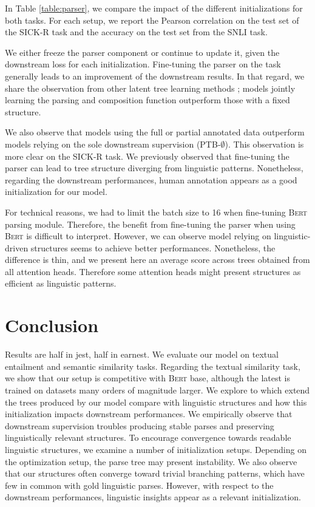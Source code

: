 In Table \ref{table:parser}, we compare the impact of the different initializations for both tasks. For each setup, we report the Pearson correlation on the test set of the SICK-R task and the accuracy on the test set from the SNLI task.

We either freeze the parser component or continue to update it, given the downstream loss for each initialization. Fine-tuning the parser on the task generally leads to an improvement of the downstream results. In that regard, we share the observation from other latent tree learning methods \parencite{maillard_19, choi_18}; models jointly learning the parsing and composition function outperform those with a fixed structure. 

We also observe that models using the full or partial annotated data outperform models relying on the sole downstream supervision (PTB-$\emptyset$). This observation is more clear on the SICK-R task. We previously observed that fine-tuning the parser can lead to tree structure diverging from linguistic patterns. Nonetheless, regarding the downstream performances, human annotation appears as a good initialization for our model. 

For technical reasons, we had to limit the batch size to 16 when fine-tuning \textsc{Bert} parsing module. Therefore, the benefit from fine-tuning the parser when using \textsc{Bert} is difficult to interpret. However, we can observe model relying on linguistic-driven structures seems to achieve better performances. Nonetheless, the difference is thin, and we present here an average score across trees obtained from all attention heads. Therefore some attention heads might present structures as efficient as linguistic patterns.

\section{Conclusion}

Results are half in jest, half in earnest. We evaluate our model on textual entailment and semantic similarity tasks. Regarding the textual similarity task, we show that our setup is competitive with \textsc{Bert} base, although the latest is trained on datasets many orders of magnitude larger. We explore to which extend the trees produced by our model compare with linguistic structures and how this initialization impacts downstream performances. We empirically observe that downstream supervision troubles producing stable parses and preserving linguistically relevant structures.  %
To encourage convergence towards readable linguistic structures, we examine a number of initialization setups. Depending on the optimization setup, the parse tree may present instability. We also observe that our structures often converge toward trivial branching patterns, which have few in common with gold linguistic parses. However, with respect to the downstream performances, linguistic insights appear as a relevant initialization.